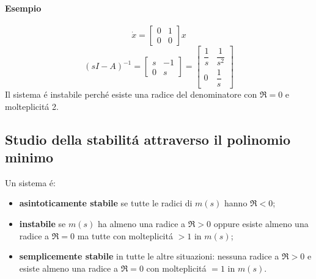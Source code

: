 \documentclass[../main.tex]{subfiles}
\begin{document}
		\begin{mdframed}[style=Esempio]
			\paragraph{Esempio}
			\[ 
				\dot x =
				\begin{bmatrix} 
					0 & 1\\
					0 & 0 
				\end{bmatrix} x
			\]
			\[
				(sI-A)^{-1} = 
				\begin{bmatrix} 
					s & -1\\
					0 & s
				\end{bmatrix} = 
				\begin{bmatrix} 
					\dfrac{1}{s} & \dfrac{1}{s^2}
					\\[1em]
					0 & \dfrac{1}{s}
				\end{bmatrix}
			\]
			Il sistema \'e instabile perch\'e esiste una radice del denominatore con $ \Re = 0 $ e molteplicit\'a 2.
		\end{mdframed}
		
	\subsection{Studio della stabilit\'a attraverso il polinomio minimo}
		Un sistema \'e:
		\begin{itemize}
			\item
				\textbf{asintoticamente stabile} se tutte le radici di $ m(s) $ hanno $ \Re < 0 $;
			\item
				\textbf{instabile} se $ m(s) $ ha almeno una radice a $ \Re > 0 $ oppure esiste almeno una radice a $ \Re = 0 $ ma tutte con molteplicit\'a $ >1 $ in $ m(s) $;
			\item
				\textbf{semplicemente stabile} in tutte le altre situazioni: nessuna radice a $ \Re > 0 $ e esiste almeno una radice a $ \Re = 0 $ con molteplicit\'a $ =1 $ in $ m(s) $.
		\end{itemize}
	
\end{document}
